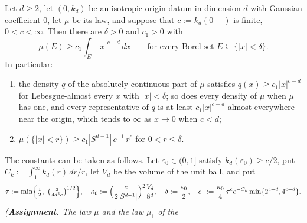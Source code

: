 \begin{proposition}
\label{prop:origin-lower-bound-d}
\leanok
Let $d \ge 2$, let $(0, k_d)$ be an isotropic origin datum in dimension $d$ with Gaussian
coefficient $0$, let $\mu$ be its law, and suppose that $c := k_d(0{+})$ is finite, $0 < c < \infty$.
Then there are $\delta > 0$ and $c_1 > 0$ with
\begin{equation}\label{eq:origin-lower-bound}
  \mu(E) \ge c_1\int_E |x|^{c-d}\,dx \qquad\text{for every Borel set } E \subseteq \{|x| < \delta\} .
\end{equation}
In particular:
\begin{enumerate}
\item the density $q$ of the absolutely continuous part of $\mu$ satisfies
$q(x) \ge c_1|x|^{c-d}$ for Lebesgue-almost every $x$ with $|x| < \delta$; so does every density of
$\mu$ when $\mu$ has one, and every representative of $q$ is at least
$c_1|x|^{c-d}$ almost everywhere near the origin, which tends to $\infty$ as $x \to 0$ when $c < d$;
\item $\mu(\{|x| < r\}) \ge c_1|S^{d-1}|\,c^{-1}\,r^{c}$ for $0 < r \le \delta$.
\end{enumerate}
The constants can be taken as follows. Let $\varepsilon_0 \in (0,1]$ satisfy
$k_d(\varepsilon_0) \ge c/2$, put $C_k := \int_1^\infty k_d(r)\,dr/r$, let $V_d$ be the volume of the
unit ball, and put
\[
  \tau := \min\Bigl\{\tfrac12,\ \bigl(\tfrac{3}{4d^2c}\bigr)^{1/2}\Bigr\},\quad
  \kappa_0 := \Bigl(\frac{c}{2|S^{d-1}|}\Bigr)^{2}\frac{V_d}{8^d},\quad
  \delta := \frac{\varepsilon_0}{2},\quad
  c_1 := \frac{\kappa_0}{4}\,\tau^{c}e^{-C_k}\min\{2^{c-d},4^{c-d}\} .
\]
\statusA\quad{}\quad\emph{(\textbf{Assignment.} The law $\mu$ and the law $\mu_1$ of the
}
\end{proposition}
